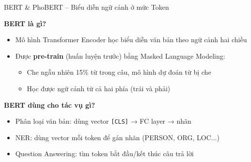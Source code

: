 \documentclass[aspectratio=169,xcolor=dvipsnames, t]{beamer}
\begin{document}
\begin{frame}{BERT \& PhoBERT – Biểu diễn ngữ cảnh ở mức Token}
\justifying
\small

\textbf{BERT là gì?}
\begin{itemize}
    \item Mô hình Transformer Encoder học biểu diễn văn bản theo ngữ cảnh hai chiều
    \item Được \textbf{pre-train} (huấn luyện trước) bằng Masked Language Modeling:
    \begin{itemize}
        \item Che ngẫu nhiên 15\% từ trong câu, mô hình dự đoán từ bị che
        \item Học được ngữ cảnh từ cả hai phía (trái và phải)
    \end{itemize}
\end{itemize}


\vspace{0.2cm}
\textbf{BERT dùng cho tác vụ gì?}
\begin{itemize}
    \item Phân loại văn bản: dùng vector \texttt{[CLS]} → FC layer → nhãn
    \item NER: dùng vector mỗi token để gán nhãn (PERSON, ORG, LOC...)
    \item Question Answering: tìm token bắt đầu/kết thúc câu trả lời
\end{itemize}

\end{frame}
\end{document}
